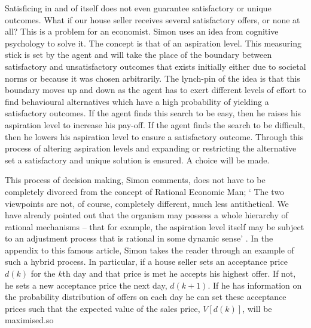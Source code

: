 \documentclass{ucthesis}
\begin{document}
Satisficing in and of itself does not even guarantee satisfactory or unique
outcomes. What if our house seller receives several satisfactory offers, or
none at all? This is a problem for an economist. Simon uses an idea from
cognitive psychology to solve it. The concept is that of an aspiration
level. This measuring stick is set by the agent and will take the place of
the boundary between satisfactory and unsatisfactory outcomes that exists
initially either due to societal norms or because it was chosen arbitrarily.
The lynch-pin of the idea is that this boundary moves up and down as the
agent has to exert different levels of effort to find behavioural
alternatives which have a high probability of yielding a satisfactory
outcomes. If the agent finds this search to be easy, then he raises his
aspiration level to increase his pay-off. If the agent finds the search to
be difficult, then he lowers his aspiration level to ensure a satisfactory
outcome. Through this process of altering aspiration levels and expanding or
restricting the alternative set a satisfactory and unique solution is
ensured. A choice will be made.

This process of decision making, Simon \cite[1955]{Simon BMRC} comments,
does not have to be completely divorced from the concept of Rational
Economic Man; ` The two viewpoints are not, of course, completely different,
much less antithetical. We have already pointed out that the organism may
possess a whole hierarchy of rational mechanisms -- that for example, the
aspiration level itself may be subject to an adjustment process that is
rational in some dynamic sense' \cite[pp. 112]{Simon BMRC}. In the appendix
to this famous article, Simon takes the reader through an example of such a
hybrid process. In particular, if a house seller sets an acceptance price $%
d(k)$ for the $k$th day and that price is met he accepts his highest offer.
If not, he sets a new acceptance price the next day, $d(k+1)$. If he has
information on the probability distribution of offers on each day he can set
these acceptance prices such that the expected value of the sales price, $%
V[d(k)]$, will be maximised.so
\end{document}
